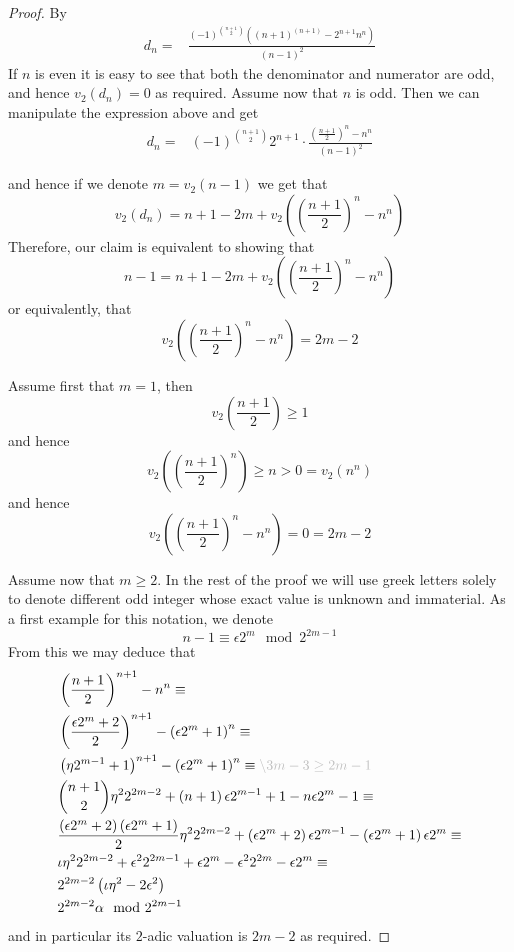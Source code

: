 \documentclass[../main.tex]{subfiles}
\begin{document}
\begin{proof}
  By \cite{MARTIN2004213} 
  \begin{align*}
    d_n = & 
    \frac{
      \left( -1 \right)^{\binom{n + 1}{2}}\left( \left( n + 1 \right)^{\left( n + 1 \right)} - 2^{n + 1} n^{ n } \right)
    }{
      \left( n - 1 \right)^2
    } 
  \end{align*}
  If $n$ is even it is easy to see that both the denominator and numerator are odd, and hence $v_2\left( d_n \right) = 0$ as required.
  Assume now that $n$ is odd.
  Then we can manipulate the expression above and get 
  \begin{align*}
    d_n = &
    \left( -1 \right)^{\binom{n + 1}{2}}2^{n + 1} \cdot
    \frac{
      \left( \frac{n + 1}{2} \right)^n - n^{ n }
    }{
      \left( n - 1 \right)^2
    }
  \end{align*}

  and hence if we denote $m = v_2\left( n - 1 \right)$ we get that 
  \[
    v_2\left( d_n \right) = n + 1 - 2m + v_2\left( \left( \frac{n + 1}{2} \right)^n - n^{ n } \right)
  \]
Therefore, our claim is equivalent to showing that 
\[
  n - 1 = n + 1 - 2m + v_2\left( \left( \frac{n + 1}{2} \right)^n - n^{ n } \right)
\]
or equivalently, that 
\[
  v_2\left( \left( \frac{n + 1}{2} \right)^n - n^{ n } \right) = 2m - 2
\]


  Assume first that $m = 1$, then 
  \[
    v_2\left( \frac{n + 1}{2} \right) \geq 1
  \]
  and hence 
  \[
    v_2\left( \left( \frac{n + 1}{2} \right)^n \right) \geq n > 0 = v_2\left( n^{ n } \right)
  \]
  and hence 
  \[
    v_2\left( \left( \frac{n + 1}{2} \right)^n - n^{ n } \right) = 0 = 2m - 2
  \]

Assume now that $m \geq 2$.
In the rest of the proof we will use greek letters solely to denote different odd integer whose exact value is unknown and immaterial.
As a first example for this notation, we denote
\[
  n - 1 \equiv \epsilon 2^m \mod 2^{2m-1}
\]
From this we may deduce that
\begin{align*}
  & \left( \frac{n + 1}{2} \right)^{n+1} - n^{n} \equiv \\
  & \left(  
    \frac{ \epsilon 2^m + 2 }{2}
  \right)^{n+1} - \left( \epsilon 2^m + 1 \right)^{ n} \equiv \\
  & \left( \eta 2^{m - 1} + 1 \right)^{n+1} - \left( \epsilon 2^m + 1 \right)^{ n } \equiv 
  \justification{3m - 3 \geq 2m - 1} \\
  & \binom{n+1}{2} \eta^2 2^{2m - 2} + \left( n + 1 \right)\epsilon 2^{m - 1} + 1 - n \epsilon 2^m - 1 \equiv  \\ 
  & \frac{
    \left( \epsilon 2^m + 2 \right)\left( \epsilon2^m + 1\right)
  }{
    2
  } \eta^2 2^{2m - 2} + \left( \epsilon 2^m + 2 \right)\epsilon 2^{m - 1} - \left( \epsilon 2^m + 1 \right) \epsilon 2^m \equiv  \\
  & \iota \eta^2 2^{2m - 2} + \epsilon^2 2^{2m-1} + \epsilon2^m - \epsilon^2 2^{2m} - \epsilon 2^m \equiv \\ 
  & 2^{2m-2}\left(  
    \iota \eta^2 - 2\epsilon^2
  \right) \\ 
  & 2^{2m-2}\alpha \mod 2^{2m-1} 
\end{align*}
and in particular its $2$-adic valuation is $2m - 2$ as required.
\end{proof}
\end{document}
